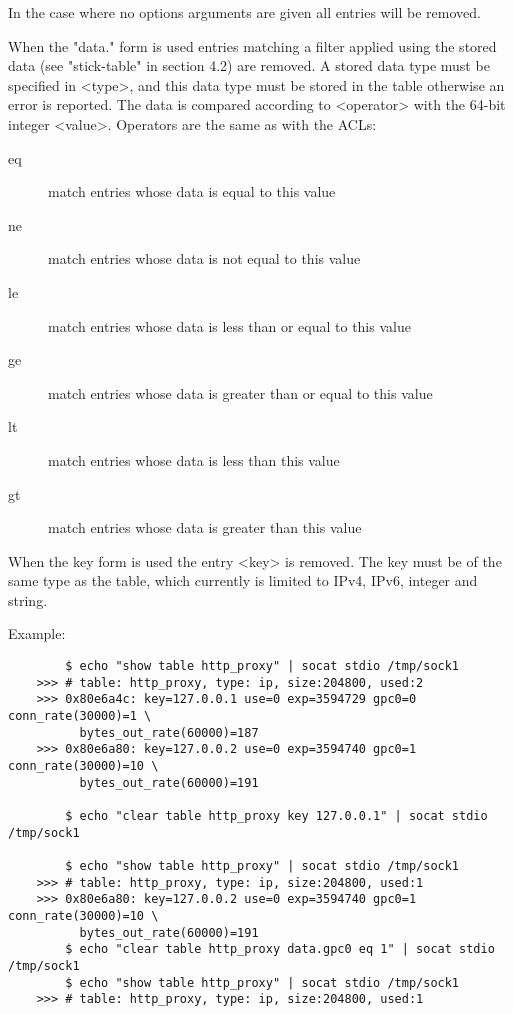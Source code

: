  In the case where no options arguments are given all entries will be removed.

  When the "data." form is used entries matching a filter applied using the
  stored data (see "stick-table" in section 4.2) are removed.  A stored data
  type must be specified in <type>, and this data type must be stored in the
  table otherwise an error is reported. The data is compared according to
  <operator> with the 64-bit integer <value>.  Operators are the same as with
  the ACLs:
  
  \begin{description}
  \item[eq] match entries whose data is equal to this value
  \item[ne] match entries whose data is not equal to this value
  \item[le] match entries whose data is less than or equal to this value
  \item[ge] match entries whose data is greater than or equal to this value
  \item[lt] match entries whose data is less than this value
  \item[gt] match entries whose data is greater than this value
  \end{description}

  When the key form is used the entry <key> is removed.  The key must be of the
  same type as the table, which currently is limited to IPv4, IPv6, integer and
  string.

  Example:
  \begin{verbatim}
        $ echo "show table http_proxy" | socat stdio /tmp/sock1
    >>> # table: http_proxy, type: ip, size:204800, used:2
    >>> 0x80e6a4c: key=127.0.0.1 use=0 exp=3594729 gpc0=0 conn_rate(30000)=1 \
          bytes_out_rate(60000)=187
    >>> 0x80e6a80: key=127.0.0.2 use=0 exp=3594740 gpc0=1 conn_rate(30000)=10 \
          bytes_out_rate(60000)=191

        $ echo "clear table http_proxy key 127.0.0.1" | socat stdio /tmp/sock1

        $ echo "show table http_proxy" | socat stdio /tmp/sock1
    >>> # table: http_proxy, type: ip, size:204800, used:1
    >>> 0x80e6a80: key=127.0.0.2 use=0 exp=3594740 gpc0=1 conn_rate(30000)=10 \
          bytes_out_rate(60000)=191
        $ echo "clear table http_proxy data.gpc0 eq 1" | socat stdio /tmp/sock1
        $ echo "show table http_proxy" | socat stdio /tmp/sock1
    >>> # table: http_proxy, type: ip, size:204800, used:1
 \end{verbatim}

